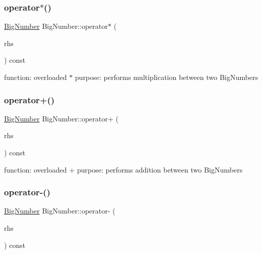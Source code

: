 \subsubsection{\texorpdfstring{operator$\ast$()}{operator*()}}
{\footnotesize\ttfamily \mbox{\hyperlink{class_big_number}{Big\+Number}} Big\+Number\+::operator$\ast$ (\begin{DoxyParamCaption}\item[{const \mbox{\hyperlink{class_big_number}{Big\+Number}} \&}]{rhs }\end{DoxyParamCaption}) const\hspace{0.3cm}{\ttfamily [inline]}}

function\+: overloaded $\ast$ purpose\+: performs multiplication between two Big\+Numbers \mbox{\label{class_big_number_a0e1171defb1f1673a54a09d6e8b77ed7}} 
\subsubsection{\texorpdfstring{operator+()}{operator+()}}
{\footnotesize\ttfamily \mbox{\hyperlink{class_big_number}{Big\+Number}} Big\+Number\+::operator+ (\begin{DoxyParamCaption}\item[{const \mbox{\hyperlink{class_big_number}{Big\+Number}} \&}]{rhs }\end{DoxyParamCaption}) const\hspace{0.3cm}{\ttfamily [inline]}}

function\+: overloaded + purpose\+: performs addition between two Big\+Numbers \mbox{\label{class_big_number_a263859c65a7521416b6a1bb49ba94380}} 
\subsubsection{\texorpdfstring{operator-\/()}{operator-()}}
{\footnotesize\ttfamily \mbox{\hyperlink{class_big_number}{Big\+Number}} Big\+Number\+::operator-\/ (\begin{DoxyParamCaption}\item[{const \mbox{\hyperlink{class_big_number}{Big\+Number}} \&}]{rhs }\end{DoxyParamCaption}) const\hspace{0.3cm}{\ttfamily [inline]}}

